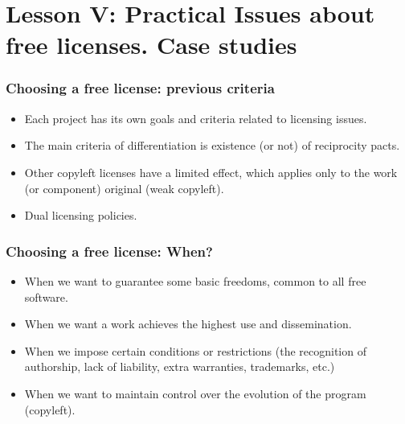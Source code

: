 

\section{Lesson V: Practical Issues about free licenses. Case studies}




\begin{frame}
\frametitle{Choosing a free license: previous criteria}

\begin{itemize}
\item Each project has its own goals and criteria related to licensing issues.
\item The main criteria of differentiation is existence (or not) of reciprocity pacts.
\item Other copyleft licenses have a limited effect, which applies only to the work (or component) original (weak copyleft). 
\item Dual licensing policies.

\end{itemize}

\end{frame}


\begin{frame}
\frametitle{Choosing a free license: When?}

\begin{itemize}
\item When we want to guarantee some basic freedoms, common to all free software.
\item When we want a work achieves the highest use and dissemination.
\item When we impose certain conditions or restrictions (the recognition of authorship, lack of liability, extra warranties, trademarks, etc.)
\item When we want to maintain control over the evolution of the program (copyleft).
\end{itemize}

\end{frame}


